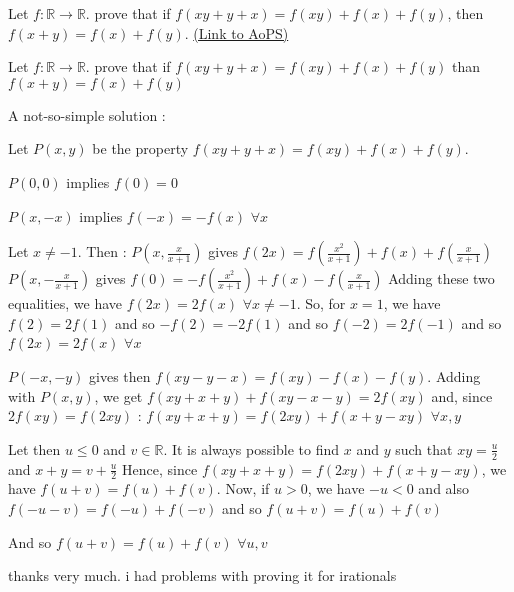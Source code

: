 \begin{problem}
	Let $ f: \mathbb{R}\to\mathbb{R}$. prove that if $ f(xy+y+x)=f(xy)+f(x)+f(y)$, then $ f(x+y)=f(x)+f(y)$.
	\flushright \href{https://artofproblemsolving.com/community/c6h179772}{(Link to AoPS)}
\end{problem}



\begin{mysolution}
	\begin{tcolorbox}Let $ f: \mathbb{R}\to\mathbb{R}$. prove that if $ f(xy + y + x) = f(xy) + f(x) + f(y)$ than $ f(x + y) = f(x) + f(y)$\end{tcolorbox}

A not-so-simple solution :

Let $ P(x,y)$ be the property $ f(xy + y + x) = f(xy) + f(x) + f(y)$.

$ P(0,0)$ implies $ \boxed{f(0)=0}$

$ P(x,-x)$ implies $ \boxed{f(-x)=-f(x)}$ $ \forall x$

Let $ x\neq -1$. Then :
$ P(x,\frac{x}{x+1})$ gives $ f(2x) = f\left(\frac{x^2}{x+1}\right) + f(x) + f\left(\frac{x}{x+1}\right)$
$ P(x,-\frac{x}{x+1})$ gives $ f(0) = -f\left(\frac{x^2}{x+1}\right) + f(x) - f\left(\frac{x}{x+1}\right)$
Adding  these two equalities, we have $ f(2x)=2f(x)$ $ \forall x\neq -1$. So, for $ x=1$, we have $ f(2)=2f(1)$ and so $ -f(2)=-2f(1)$ and so $ f(-2)=2f(-1)$ and so 
$ \boxed{f(2x)=2f(x)}$ $ \forall x$

$ P(-x,-y)$ gives then $ f(xy - y - x) = f(xy) - f(x) - f(y)$. Adding with $ P(x,y)$, we get $ f(xy+x+y)+f(xy-x-y)=2f(xy)$ and, since $ 2f(xy)=f(2xy)$ :
$ \boxed{f(xy+x+y)=f(2xy)+f(x+y-xy)}$ $ \forall x,y$

Let then $ u\leq 0$ and $ v\in \mathbb{R}$. It is always possible to find $ x$ and $ y$ such that $ xy=\frac{u}{2}$ and $ x+y=v+\frac{u}{2}$
Hence, since ${ f(xy+x+y)=f(2xy)+f(x+y-xy)}$, we have $ f(u+v)=f(u)+f(v)$.
Now, if $ u>0$, we have $ -u<0$ and also $ f(-u-v)=f(-u)+f(-v)$ and so $ f(u+v)=f(u)+f(v)$

And so $ \boxed{f(u+v)=f(u)+f(v)}$ $ \forall u,v$
\end{mysolution}



\begin{mysolution}
	thanks very much. i had problems with proving it for irationals
\end{mysolution}



